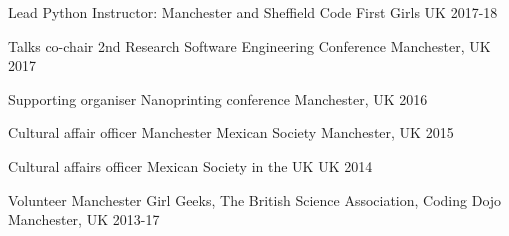 \begin{cvhonors}

\cvhonor
{Lead Python Instructor: Manchester and Sheffield} %
{Code First Girls} %
{UK} %
{2017-18} %


\cvhonor
{Talks co-chair} %
{2nd Research Software Engineering Conference} %
{ Manchester, UK} %
{2017} %
    

\cvhonor
{Supporting organiser} %
{Nanoprinting conference} %
{Manchester, UK} %
{2016} %


\cvhonor
{Cultural affair officer}
{Manchester Mexican Society}
{Manchester, UK}
{2015}

\cvhonor
{Cultural affairs officer}
{Mexican Society in the UK}
{UK}
{2014}


\cvhonor
{Volunteer} %
{Manchester Girl Geeks, The British Science Association, Coding Dojo} %
{Manchester, UK} %
{2013-17} %


\end{cvhonors}